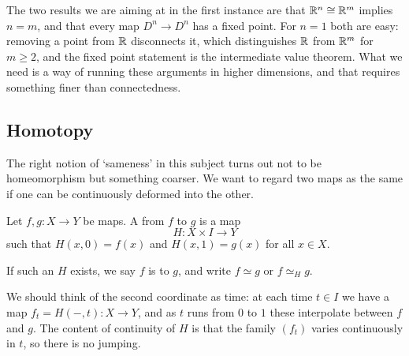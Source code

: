 \documentclass[a4paper]{scrartcl}
\begin{document}
The two results we are aiming at in the first instance are that $\mathbb{R}^n \cong \mathbb{R}^m$ implies
$n = m$, and that every map $D^n \to D^n$ has a fixed point. For $n = 1$ both are easy:
removing a point from $\mathbb{R}$ disconnects it, which distinguishes $\mathbb{R}$ from $\mathbb{R}^m$ for
$m \geq 2$, and the fixed point statement is the intermediate value theorem. What we need
is a way of running these arguments in higher dimensions, and that requires something
finer than connectedness.

\subsection{Homotopy}

The right notion of `sameness' in this subject turns out not to be homeomorphism but
something coarser. We want to regard two maps as the same if one can be continuously
deformed into the other.

\begin{definition}[Homotopy]
	Let $f, g: X \rightarrow Y$ be maps. A  from $f$ to $g$ is a map
	$$
	H: X \times I \rightarrow Y
	$$
	such that $H(x, 0)=f(x)$ and $H(x, 1)=g(x)$ for all $x \in X$.

	If such an $H$ exists, we say $f$ is  to $g$, and write $f \simeq g$ or $f \simeq_H g$.
\end{definition}

We should think of the second coordinate as time: at each time $t \in I$ we have a map
$f_t = H(-, t): X \to Y$, and as $t$ runs from $0$ to $1$ these interpolate between $f$
and $g$. The content of continuity of $H$ is that the family $(f_t)$ varies continuously
in $t$, so there is no jumping.

\begin{center}
\end{center}
\end{document}
